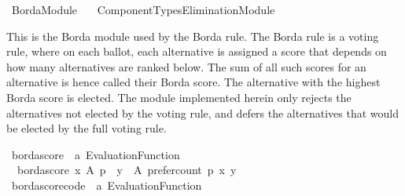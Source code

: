 %
\begin{isabellebody}%
%
%
\isadelimdocument
\isanewline
%
\endisadelimdocument
%
\isatagdocument
\isanewline
%
\isamarkuptrue%
%
\endisatagdocument
{\isafolddocument}%
%
\isadelimdocument
%
\endisadelimdocument
%
\isadelimtheory
%
\endisadelimtheory
%
\isatagtheory
{}\isamarkupfalse%
\ Borda{\isacharunderscore}{\kern0pt}Module\isanewline
\ \ \ {\isachardoublequoteopen}Component{\isacharunderscore}{\kern0pt}Types{\isacharslash}{\kern0pt}Elimination{\isacharunderscore}{\kern0pt}Module{\isachardoublequoteclose}\isanewline
{}%
\endisatagtheory
{\isafoldtheory}%
%
\isadelimtheory
%
\endisadelimtheory
%
\begin{isamarkuptext}%
This is the Borda module used by the Borda rule. The Borda rule is a voting
rule, where on each ballot, each alternative is assigned a score that depends
on how many alternatives are ranked below. The sum of all such scores for an
alternative is hence called their Borda score. The alternative with the highest
Borda score is elected. The module implemented herein only rejects the
alternatives not elected by the voting rule, and defers the alternatives that
would be elected by the full voting rule.%
\end{isamarkuptext}\isamarkuptrue%
%
\isadelimdocument
%
\endisadelimdocument
%
\isatagdocument
%
\isamarkuptrue%
%
\endisatagdocument
{\isafolddocument}%
%
\isadelimdocument
%
\endisadelimdocument
{}\isamarkupfalse%
\ borda{\isacharunderscore}{\kern0pt}score\ {\isacharcolon}{\kern0pt}{\isacharcolon}{\kern0pt}\ {\isachardoublequoteopen}{\isacharprime}{\kern0pt}a\ Evaluation{\isacharunderscore}{\kern0pt}Function{\isachardoublequoteclose}\ \isanewline
\ \ {\isachardoublequoteopen}borda{\isacharunderscore}{\kern0pt}score\ x\ A\ p\ {\isacharequal}{\kern0pt}\ {\isacharparenleft}{\kern0pt}{\isasymSum}y\ {\isasymin}\ A{\isachardot}{\kern0pt}\ {\isacharparenleft}{\kern0pt}prefer{\isacharunderscore}{\kern0pt}count\ p\ x\ y{\isacharparenright}{\kern0pt}{\isacharparenright}{\kern0pt}{\isachardoublequoteclose}\isanewline
\isanewline
{}\isamarkupfalse%
\ borda{\isacharunderscore}{\kern0pt}score{\isacharunderscore}{\kern0pt}code\ {\isacharcolon}{\kern0pt}{\isacharcolon}{\kern0pt}\ {\isachardoublequoteopen}{\isacharprime}{\kern0pt}a\ Evaluation{\isacharunderscore}{\kern0pt}Function{\isachardoublequoteclose}\ \isanewline

\end{isabellebody}
